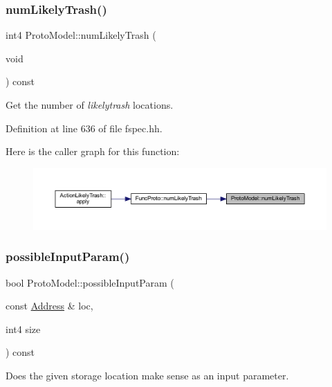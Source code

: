 \subsubsection{\texorpdfstring{numLikelyTrash()}{numLikelyTrash()}}
{\footnotesize\ttfamily int4 Proto\+Model\+::num\+Likely\+Trash (\begin{DoxyParamCaption}\item[{void}]{ }\end{DoxyParamCaption}) const\hspace{0.3cm}{\ttfamily [inline]}}



Get the number of {\itshape likelytrash} locations. 



Definition at line 636 of file fspec.\+hh.

Here is the caller graph for this function\+:
\nopagebreak
\begin{figure}[H]
\begin{center}
\leavevmode
\includegraphics[width=350pt]{class_proto_model_a8d1f841c8f099cc2f124b8257c51d50f_icgraph}
\end{center}
\end{figure}
\mbox{\label{class_proto_model_a1c0e6fe360413702b20cd04367dc477f}} 
\subsubsection{\texorpdfstring{possibleInputParam()}{possibleInputParam()}}
{\footnotesize\ttfamily bool Proto\+Model\+::possible\+Input\+Param (\begin{DoxyParamCaption}\item[{const \mbox{\hyperlink{class_address}{Address}} \&}]{loc,  }\item[{int4}]{size }\end{DoxyParamCaption}) const\hspace{0.3cm}{\ttfamily [inline]}}



Does the given storage location make sense as an input parameter. 

